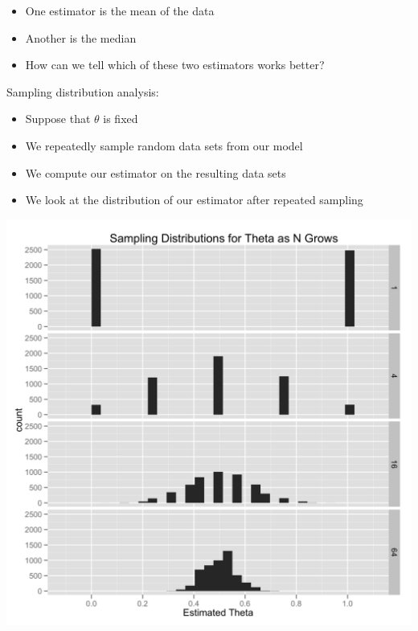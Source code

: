 \documentclass{beamer}
\begin{document}
\frame
{
  \begin{itemize}
    \item{One estimator is the mean of the data}
    \item{Another is the median}
  \end{itemize}
}

\frame
{
  \begin{itemize}
    \item{How can we tell which of these two estimators works better?}
  \end{itemize}
}

\frame
{
  Sampling distribution analysis:
  \begin{itemize}
    \item{Suppose that $\theta$ is fixed}
    \item{We repeatedly sample random data sets from our model}
    \item{We compute our estimator on the resulting data sets}
    \item{We look at the distribution of our estimator after repeated sampling}
  \end{itemize}
}

\frame
{
  \begin{center}
    \includegraphics[scale = 0.1]{sampling_distribution.png}
  \end{center}
}
\end{document}
